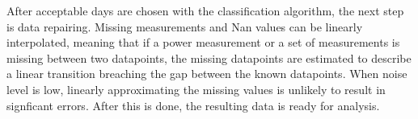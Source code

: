 After acceptable days are chosen with the classification algorithm, the next step is data repairing. Missing measurements and Nan values can be linearly interpolated, meaning that if a power measurement or a set of measurements is missing between two datapoints, the missing datapoints are estimated to describe a linear transition breaching the gap between the known datapoints. When noise level is low, linearly approximating the missing values is unlikely to result in signficant errors. After this is done, the resulting data is ready for analysis.


















